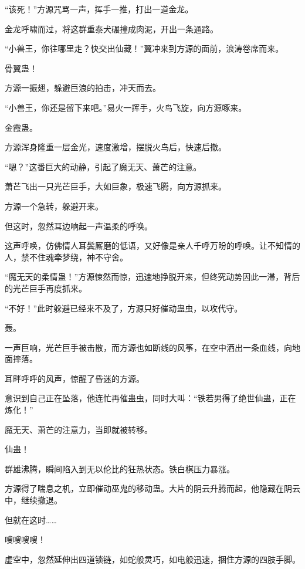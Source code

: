 
\begin{this_body}

“该死！”方源咒骂一声，挥手一推，打出一道金龙。

金龙呼啸而过，将这群重泰犬碾撞成肉泥，开出一条通路。

“小兽王，你往哪里走？快交出仙藏！”翼冲来到方源的面前，浪涛卷席而来。

骨翼蛊！

方源一振翅，躲避巨浪的拍击，冲天而去。

“小兽王，你还是留下来吧。”易火一挥手，火鸟飞旋，向方源啄来。

金霞蛊。

方源浑身隆重一层金光，速度激增，摆脱火鸟后，快速后撤。

“嗯？”这番巨大的动静，引起了魔无天、萧芒的注意。

萧芒飞出一只光芒巨手，大如巨象，极速飞腾，向方源抓来。

方源一个急转，躲避开来。

但这时，忽然耳边响起一声温柔的呼唤。

这声呼唤，仿佛情人耳鬓厮磨的低语，又好像是亲人千呼万盼的呼唤。让不知情的人，禁不住魂牵梦绕，神不守舍。

“魔无天的柔情蛊！”方源悚然而惊，迅速地挣脱开来，但终究动势因此一滞，背后的光芒巨手再度抓来。

“不好！”此时躲避已经来不及了，方源只好催动蛊虫，以攻代守。

轰。

一声巨响，光芒巨手被击散，而方源也如断线的风筝，在空中洒出一条血线，向地面摔落。

耳畔呼呼的风声，惊醒了昏迷的方源。

意识到自己正在坠落，他连忙再催蛊虫，同时大叫：“铁若男得了绝世仙蛊，正在炼化！”

魔无天、萧芒的注意力，当即就被转移。

仙蛊！

群雄沸腾，瞬间陷入到无以伦比的狂热状态。铁白棋压力暴涨。

方源得了喘息之机，立即催动巫鬼的移动蛊。大片的阴云升腾而起，他隐藏在阴云中，继续撤退。

但就在这时……

嗖嗖嗖嗖！

虚空中，忽然延伸出四道锁链，如蛇般灵巧，如电般迅速，捆住方源的四肢手脚。


\end{this_body}
